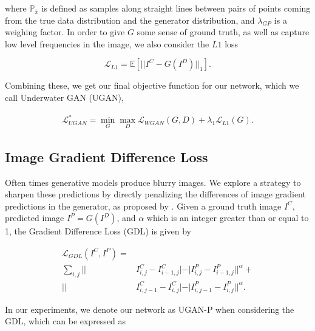 \noindent where $\mathbb{P}_{\hat{x}}$ is defined as samples along straight lines between pairs of points coming from
the true data distribution and the generator distribution, and $\lambda_{GP}$ is a weighing factor. In order to give $G$
some sense of ground truth, as well as capture low level frequencies in the image, we also consider the $L1$ loss

\begin{equation}
   \mathcal{L}_{L1} = \mathbb{E} [ || I^C - G(I^D) ||_1 ].
\end{equation}

\noindent Combining these, we get our final objective function for our network, which we call Underwater GAN (UGAN),

\begin{equation}
   \begin{aligned}
      \mathcal{L}_{UGAN}^* = \min\limits_{G}\max\limits_{D} \mathcal{L}_{WGAN}(G,D) + \lambda_{1} \mathcal{L}_{L1}(G).
   \end{aligned}
\end{equation}


\subsection{Image Gradient Difference Loss}
Often times generative models produce blurry images. We explore a strategy to sharpen these predictions by
directly penalizing the differences of image gradient predictions in the generator, as proposed by
\cite{mathieu2015deep}. Given a ground truth image $I^C$, predicted image $I^P = G(I^D)$, and $\alpha$ which is an integer 
greater than or equal to 1, the Gradient Difference Loss (GDL) is given by

\begin{equation}
   \begin{aligned}
      \mathcal{L}_{GDL}(I^C, I^P) = \\ \sum\limits_{i,j} || & I^C_{i,j} - I^C_{i-1,j}| - | I^P_{i,j} - I^P_{i-1,j}||^{\alpha} + \\
      || & I^C_{i,j-1} - I^C_{i,j}| - | I^P_{i,j-1} - I^P_{i,j}||^{\alpha}.
   \end{aligned}
   \label{gdl_eq}
\end{equation}

\noindent In our experiments, we denote our network as UGAN-P when considering the GDL, which can be expressed as

